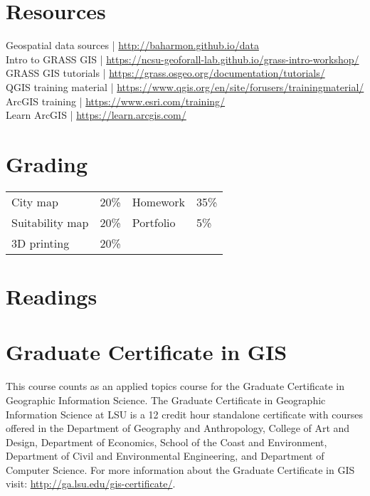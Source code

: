 \documentclass[11pt,article,oneside]{memoir}
\begin{document}
\section{Resources}
Geospatial data sources | \url{http://baharmon.github.io/data}\\
Intro to GRASS GIS | \url{https://ncsu-geoforall-lab.github.io/grass-intro-workshop/}\\
GRASS GIS tutorials | \url{https://grass.osgeo.org/documentation/tutorials/}\\
QGIS training material | \url{https://www.qgis.org/en/site/forusers/trainingmaterial/}\\
ArcGIS training | \url{https://www.esri.com/training/}\\
Learn ArcGIS | \url{https://learn.arcgis.com/}\\

\section{Grading}
\vspace*{-0.4cm}
\begin{table}[H]
\begin{tabular}{@{}l r @{\hskip 2cm} l @{\hskip 0.5cm} l}
City map & 20\% & Homework & 35\% \\
Suitability map & 20\% & Portfolio & 5\% \\
3D printing & 20\% \\
\end{tabular}
\end{table}

\clearpage

\section{Readings}
\vspace*{0.5cm}
\nocite{*}
\setlength{}
\printbibliography[heading=none]

\section{Graduate Certificate in GIS}
This course counts as an applied topics course for the 
Graduate Certificate in Geographic Information Science.
The Graduate Certificate in Geographic Information Science at LSU 
is a 12 credit hour standalone certificate
with courses offered 
in the Department of Geography and Anthropology, 
College of Art and Design, 
Department of Economics, 
School of the Coast and Environment, 
Department of Civil and Environmental Engineering, 
and Department of Computer Science. 
For more information about the Graduate Certificate in GIS visit: 
\url{http://ga.lsu.edu/gis-certificate/}.
\end{document}
